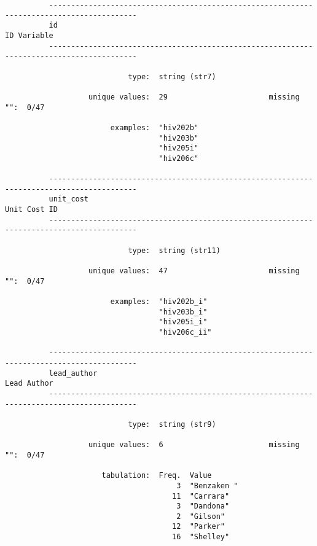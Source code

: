 \documentclass{article}
\begin{document}
\begin{verbatim}
          ------------------------------------------------------------------------------------------
          id                                                                             ID Variable
          ------------------------------------------------------------------------------------------
          
                            type:  string (str7)
          
                   unique values:  29                       missing "":  0/47
          
                        examples:  "hiv202b"
                                   "hiv203b"
                                   "hiv205i"
                                   "hiv206c"
          
          ------------------------------------------------------------------------------------------
          unit_cost                                                                     Unit Cost ID
          ------------------------------------------------------------------------------------------
          
                            type:  string (str11)
          
                   unique values:  47                       missing "":  0/47
          
                        examples:  "hiv202b_i"
                                   "hiv203b_i"
                                   "hiv205i_i"
                                   "hiv206c_ii"
          
          ------------------------------------------------------------------------------------------
          lead_author                                                                    Lead Author
          ------------------------------------------------------------------------------------------
          
                            type:  string (str9)
          
                   unique values:  6                        missing "":  0/47
          
                      tabulation:  Freq.  Value
                                       3  "Benzaken "
                                      11  "Carrara"
                                       3  "Dandona"
                                       2  "Gilson"
                                      12  "Parker"
                                      16  "Shelley"
          

\end{verbatim}
\end{document}
